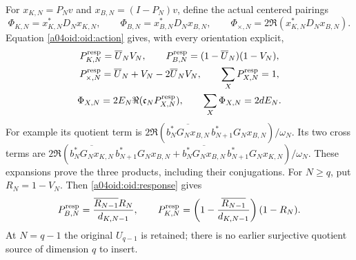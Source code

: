\documentclass[11pt,a4paper]{article}
\begin{document}
For $x_{K,N}=P_Nv$ and $x_{B,N}=(I-P_N)v$, define the actual
centered pairings
\[
 \Phi_{K,N}=x_{K,N}^*D_Nx_{K,N},\qquad
 \Phi_{B,N}=x_{B,N}^*D_Nx_{B,N},\qquad
 \Phi_{\times,N}=2\Re(x_{K,N}^*D_Nx_{B,N}).
\]
Equation \eqref{a04oid:oid:action} gives, with every orientation explicit,
\begin{equation}\label{a04oid:oid:products}
\begin{gathered}
 P_{K,N}^{\rm resp}=\overline U_NV_N,\qquad
 P_{B,N}^{\rm resp}=(1-\overline U_N)(1-V_N),\\
 P_{\times,N}^{\rm resp}=\overline U_N+V_N-2\overline U_NV_N,
 \qquad \sum_XP_{X,N}^{\rm resp}=1,\\
 \Phi_{X,N}=2E_N\Re(\mathfrak c_NP_{X,N}^{\rm resp}),\qquad
 \sum_X\Phi_{X,N}=2dE_N.
\end{gathered}
\end{equation}
For example its quotient term is
$2\Re(\overline{b_N^*G_Nx_{B,N}}\,
b_{N+1}^*G_Nx_{B,N})/\omega_N$. Its two cross terms are
$2\Re(\overline{b_N^*G_Nx_{K,N}}\,b_{N+1}^*G_Nx_{B,N}
+\overline{b_N^*G_Nx_{B,N}}\,b_{N+1}^*G_Nx_{K,N})/\omega_N$.
These expansions prove the three products, including their conjugations.
For $N\ge q$, put $R_N=1-V_N$. Then \eqref{a04oid:oid:response} gives
\begin{equation}\label{a04oid:oid:consecutiveproducts}
 P_{B,N}^{\rm resp}
 =\frac{\overline{R_{N-1}}R_N}{d_{K,N-1}},\qquad
 P_{K,N}^{\rm resp}
 =\left(1-\frac{\overline{R_{N-1}}}{d_{K,N-1}}\right)(1-R_N).
\end{equation}
At $N=q-1$ the original $U_{q-1}$ is retained; there is no earlier
surjective quotient source of dimension $q$ to insert.
\end{document}
